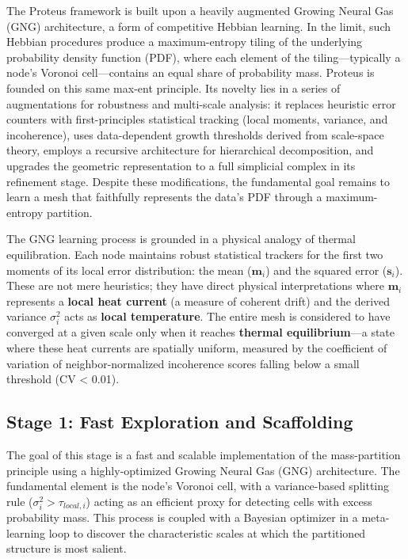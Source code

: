 \documentclass[11pt]{article}
\begin{document}
The Proteus framework is built upon a heavily augmented Growing Neural Gas (GNG) architecture, a form of competitive Hebbian learning. In the limit, such Hebbian procedures produce a maximum-entropy tiling of the underlying probability density function (PDF), where each element of the tiling—typically a node's Voronoi cell—contains an equal share of probability mass. Proteus is founded on this same max-ent principle. Its novelty lies in a series of augmentations for robustness and multi-scale analysis: it replaces heuristic error counters with first-principles statistical tracking (local moments, variance, and incoherence), uses data-dependent growth thresholds derived from scale-space theory, employs a recursive architecture for hierarchical decomposition, and upgrades the geometric representation to a full simplicial complex in its refinement stage. Despite these modifications, the fundamental goal remains to learn a mesh that faithfully represents the data's PDF through a maximum-entropy partition.

The GNG learning process is grounded in a physical analogy of thermal equilibration. Each node maintains robust statistical trackers for the first two moments of its local error distribution: the mean ($\mathbf m_i$) and the squared error ($\mathbf s_i$). These are not mere heuristics; they have direct physical interpretations where $\mathbf m_i$ represents a \textbf{local heat current} (a measure of coherent drift) and the derived variance $\sigma_i^2$ acts as \textbf{local temperature}. The entire mesh is considered to have converged at a given scale only when it reaches \textbf{thermal equilibrium}---a state where these heat currents are spatially uniform, measured by the coefficient of variation of neighbor-normalized incoherence scores falling below a small threshold (CV < 0.01).

\subsection{Stage 1: Fast Exploration and Scaffolding}
The goal of this stage is a fast and scalable implementation of the mass-partition principle using a highly-optimized Growing Neural Gas (GNG) architecture. The fundamental element is the node's Voronoi cell, with a variance-based splitting rule ($\sigma_i^2 > \tau_{local,i}$) acting as an efficient proxy for detecting cells with excess probability mass. This process is coupled with a Bayesian optimizer in a meta-learning loop to discover the characteristic scales at which the partitioned structure is most salient.
\end{document}
